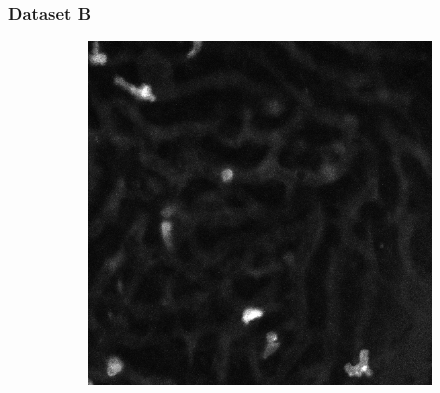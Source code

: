    	
   	
	\subsubsection{Dataset B}
	\begin{figure}[h]
		\begin{subfigure}{.32\textwidth}
		\includegraphics[width=\textwidth]{images/series30red024}
		\end{subfigure}%
		\hfill
		\begin{subfigure}{.32\textwidth}

\end{subfigure}
\end{figure}
